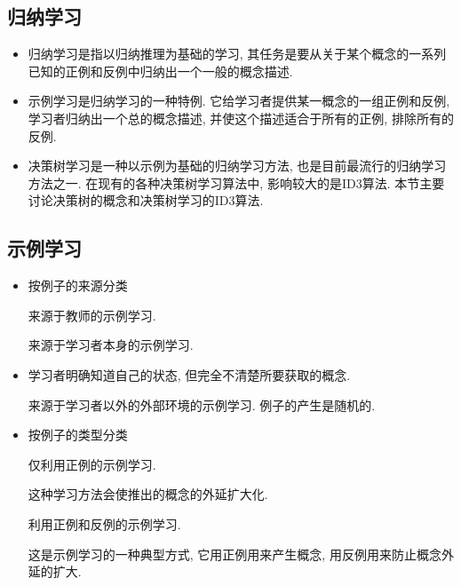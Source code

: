 \subsection{归纳学习}
\begin{itemize}
\item 归纳学习是指以归纳推理为基础的学习, 其任务是要从关于某个概念的一系列已知的正例和反例中归纳出一个一般的概念描述.
\item 示例学习是归纳学习的一种特例. 它给学习者提供某一概念的一组正例和反例, 学习者归纳出一个总的概念描述, 并使这个描述适合于所有的正例, 排除所有的反例.
\item 决策树学习是一种以示例为基础的归纳学习方法, 也是目前最流行的归纳学习方法之一. 在现有的各种决策树学习算法中, 影响较大的是ID3算法. 本节主要讨论决策树的概念和决策树学习的ID3算法.
\end{itemize}
\subsection{示例学习}
\begin{itemize}
\item 按例子的来源分类

  \qquad  {} 来源于教师的示例学习.

  \qquad  {} 来源于学习者本身的示例学习.
\item 学习者明确知道自己的状态, 但完全不清楚所要获取的概念.

    \qquad  {} 来源于学习者以外的外部环境的示例学习. 例子的产生是随机的.
\item 按例子的类型分类

    \qquad  {} 仅利用正例的示例学习.

    \qquad  \qquad 这种学习方法会使推出的概念的外延扩大化.

    \qquad  {} 利用正例和反例的示例学习.

    \qquad  这是示例学习的一种典型方式, 它用正例用来产生概念, 用反例用来防止概念外延的扩大.
\end{itemize}
